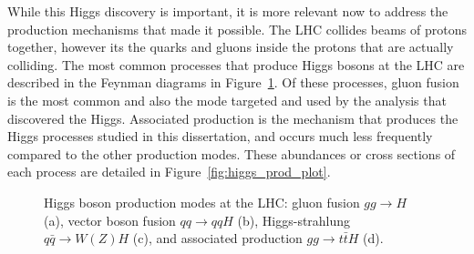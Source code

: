 While this Higgs discovery is important, it is more relevant now to address the production mechanisms that made it possible. The LHC collides beams of protons together,
however its the quarks and gluons inside the protons that are actually colliding. The most common processes that produce Higgs bosons at the LHC are described in the
Feynman diagrams in Figure~\ref{fig:higgs_production}. Of these processes, gluon fusion is the most common and also the mode targeted and used by the analysis that
discovered the Higgs. Associated production is the mechanism that produces the Higgs processes studied in this dissertation, and occurs much less frequently compared to
the other production modes. These abundances or cross sections of each process are detailed in Figure~\ref{fig:higgs_prod_plot}.


\begin{figure}[htbp] 
  {\centering
    \caption[Higgs boson production modes at the LHC]{Higgs boson production modes at the LHC:
      gluon fusion $gg\to{}H$ (a), vector boson fusion $qq\to{}qqH$ (b),
      Higgs-strahlung $q\bar{q}\to{}W(Z)H$ (c), and associated
      production $gg\to{}t\bar{t}H$ (d).}
    \label{fig:higgs_production}}
\end{figure}

